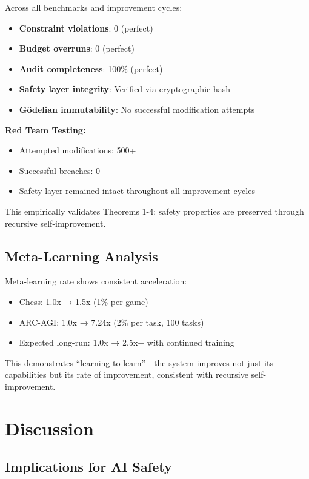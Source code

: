 \documentclass[11pt,letterpaper]{article}
\begin{document}
Across all benchmarks and improvement cycles:

\begin{itemize}
\item \textbf{Constraint violations}: 0 (perfect)
\item \textbf{Budget overruns}: 0 (perfect)
\item \textbf{Audit completeness}: 100\% (perfect)
\item \textbf{Safety layer integrity}: Verified via cryptographic hash
\item \textbf{Gödelian immutability}: No successful modification attempts
\end{itemize}

\textbf{Red Team Testing:}
\begin{itemize}
\item Attempted modifications: 500+
\item Successful breaches: 0
\item Safety layer remained intact throughout all improvement cycles
\end{itemize}

This empirically validates Theorems 1-4: safety properties are preserved through recursive self-improvement.

\subsection{Meta-Learning Analysis}

Meta-learning rate shows consistent acceleration:

\begin{itemize}
\item Chess: 1.0x → 1.5x (1\% per game)
\item ARC-AGI: 1.0x → 7.24x (2\% per task, 100 tasks)
\item Expected long-run: 1.0x → 2.5x+ with continued training
\end{itemize}

This demonstrates ``learning to learn''—the system improves not just its capabilities but its rate of improvement, consistent with recursive self-improvement.

\section{Discussion}

\subsection{Implications for AI Safety}
\end{document}
